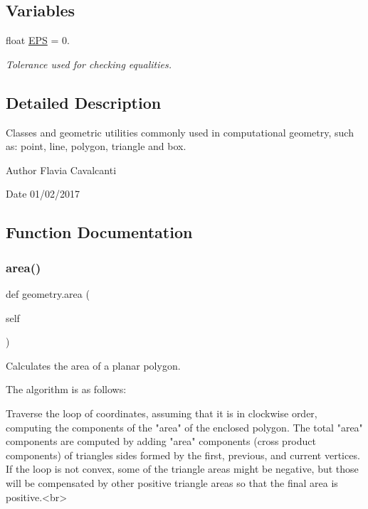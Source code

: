 \subsection*{Variables}
\begin{DoxyCompactItemize}
\item 
float \hyperlink{namespacegeometry_a543db87a5e9af9e1d17146559a540276}{E\+PS} = 0.
\begin{DoxyCompactList}\small\item\em Tolerance used for checking equalities. \end{DoxyCompactList}\end{DoxyCompactItemize}


\subsection{Detailed Description}
Classes and geometric utilities commonly used in computational geometry, such as\+: point, line, polygon, triangle and box. 

\begin{DoxyAuthor}{Author}
Flavia Cavalcanti 
\end{DoxyAuthor}
\begin{DoxyDate}{Date}
01/02/2017 
\end{DoxyDate}


\subsection{Function Documentation}
\mbox{\label{namespacegeometry_a7c89848bc4970d590b82641648503bd9}} 
\subsubsection{\texorpdfstring{area()}{area()}}
{\footnotesize\ttfamily def geometry.\+area (\begin{DoxyParamCaption}\item[{}]{self }\end{DoxyParamCaption})}



Calculates the area of a planar polygon. 

The algorithm is as follows\+:~\newline
 \begin{DoxyVerb}Traverse the loop of coordinates, assuming that it is in
clockwise order, computing the components of the "area" of the
enclosed polygon.  The total "area" components are computed by
adding "area" components (cross product components) of
triangles sides formed by the first, previous, and current
vertices.  If the loop is not convex, some of the triangle
areas might be negative, but those will be compensated by other
positive triangle areas so that the final area is positive.<br>
\end{DoxyVerb}


